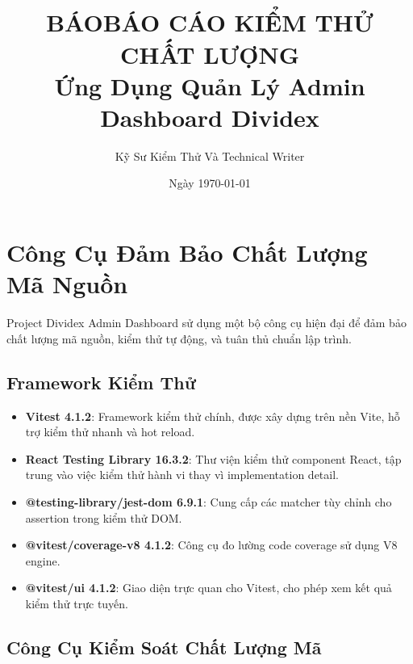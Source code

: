 \documentclass[12pt,a4paper,vietnamese]{article}
\title{\textbf{\\BÁOBÁO CÁO KIỂM THỬ CHẤT LƯỢNG\\Ứng Dụng Quản Lý Admin Dashboard Dividex\\}}
\author{Kỹ Sư Kiểm Thử Và Technical Writer\\}
\date{Ngày \today}
\begin{document}
\maketitle

\newpage
\tableofcontents
\newpage


\section{Công Cụ Đảm Bảo Chất Lượng Mã Nguồn}

Project Dividex Admin Dashboard sử dụng một bộ công cụ hiện đại để đảm bảo chất lượng mã nguồn, kiểm thử tự động, và tuân thủ chuẩn lập trình.

\subsection{Framework Kiểm Thử}

\begin{itemize}
    \item \textbf{Vitest 4.1.2}: Framework kiểm thử chính, được xây dựng trên nền Vite, hỗ trợ kiểm thử nhanh và hot reload.
    \item \textbf{React Testing Library 16.3.2}: Thư viện kiểm thử component React, tập trung vào việc kiểm thử hành vi thay vì implementation detail.
    \item \textbf{@testing-library/jest-dom 6.9.1}: Cung cấp các matcher tùy chỉnh cho assertion trong kiểm thử DOM.
    \item \textbf{@vitest/coverage-v8 4.1.2}: Công cụ đo lường code coverage sử dụng V8 engine.
    \item \textbf{@vitest/ui 4.1.2}: Giao diện trực quan cho Vitest, cho phép xem kết quả kiểm thử trực tuyến.
\end{itemize}

\subsection{Công Cụ Kiểm Soát Chất Lượng Mã}
\end{document}
